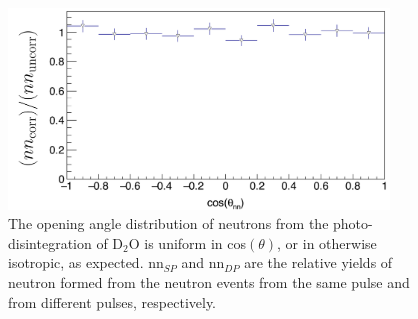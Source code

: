 \begin{figure}[h]
\includegraphics[width=0.9\textwidth]{Content/Methods/D2Otheta_nn.png}
\caption{The opening angle distribution of neutrons from the photo-disintegration of D$_{2}$O  is uniform in cos$(\theta)$, or in otherwise isotropic, as expected.
nn$_{SP}$ and nn$_{DP}$ are the relative yields of neutron formed from the neutron events from the same pulse and from different pulses, respectively.}
\label{fig:D2Otheta_nn}
\end{figure}

\FloatBarrier
